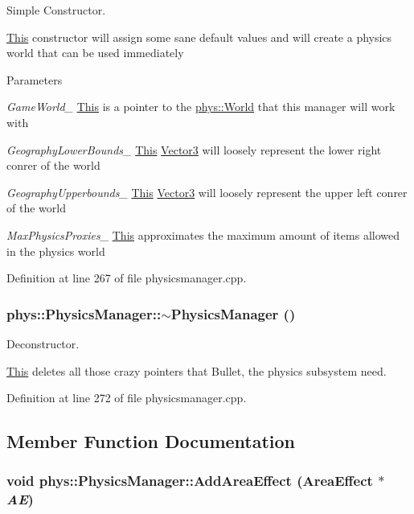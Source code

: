 Simple Constructor. 

\hyperlink{structThis}{This} constructor will assign some sane default values and will create a physics world that can be used immediately 
\begin{DoxyParams}{Parameters}
\item[{\em GameWorld\_\-}]\hyperlink{structThis}{This} is a pointer to the \hyperlink{classphys_1_1World}{phys::World} that this manager will work with \item[{\em GeographyLowerBounds\_\-}]\hyperlink{structThis}{This} \hyperlink{classphys_1_1Vector3}{Vector3} will loosely represent the lower right conrer of the world \item[{\em GeographyUpperbounds\_\-}]\hyperlink{structThis}{This} \hyperlink{classphys_1_1Vector3}{Vector3} will loosely represent the upper left conrer of the world \item[{\em MaxPhysicsProxies\_\-}]\hyperlink{structThis}{This} approximates the maximum amount of items allowed in the physics world \end{DoxyParams}


Definition at line 267 of file physicsmanager.cpp.

\hypertarget{classphys_1_1PhysicsManager_a4898702f889c6b4aa7c0b59991d310b0}{
\subsubsection[{$\sim$PhysicsManager}]{\setlength{\rightskip}{0pt plus 5cm}phys::PhysicsManager::$\sim$PhysicsManager ()}}
\label{d3/dcc/classphys_1_1PhysicsManager_a4898702f889c6b4aa7c0b59991d310b0}


Deconstructor. 

\hyperlink{structThis}{This} deletes all those crazy pointers that Bullet, the physics subsystem need. 

Definition at line 272 of file physicsmanager.cpp.



\subsection{Member Function Documentation}
\hypertarget{classphys_1_1PhysicsManager_a64e75a71598b6440c4feb1a2214a1420}{
\subsubsection[{AddAreaEffect}]{\setlength{\rightskip}{0pt plus 5cm}void phys::PhysicsManager::AddAreaEffect ({\bf AreaEffect} $\ast$ {\em AE})}}
\label{d3/dcc/classphys_1_1PhysicsManager_a64e75a71598b6440c4feb1a2214a1420}


